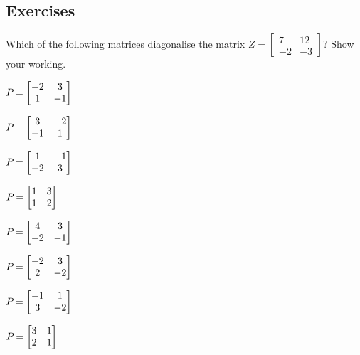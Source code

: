 \subsection{Exercises}


\begin{exercise} \label{ex:whichp} 
Which of the following matrices diagonalise the matrix \(Z=\begin{bmatrix} 7&12\\-2&-3 \end{bmatrix}\)?  
Show your working.
\begin{parts}
\item \(P_{\alph{enumii}}=\begin{bmatrix} -2&3\\1&-1 \end{bmatrix}\)

\item \(P_{\alph{enumii}}=\begin{bmatrix} 3&-2\\-1&1 \end{bmatrix}\)

\item \(P_{\alph{enumii}}=\begin{bmatrix} 1&-1\\-2&3 \end{bmatrix}\)

\item \(P_{\alph{enumii}}=\begin{bmatrix} 1&3\\1&2 \end{bmatrix}\)

\item \(P_{\alph{enumii}}=\begin{bmatrix} 4&3\\-2&-1 \end{bmatrix}\)

\item \(P_{\alph{enumii}}=\begin{bmatrix} -2&3\\2&-2 \end{bmatrix}\)

\item \(P_{\alph{enumii}}=\begin{bmatrix} -1&1\\3&-2 \end{bmatrix}\)

\item \(P_{\alph{enumii}}=\begin{bmatrix} 3&1\\2&1 \end{bmatrix}\)

\end{parts}
\end{exercise}



